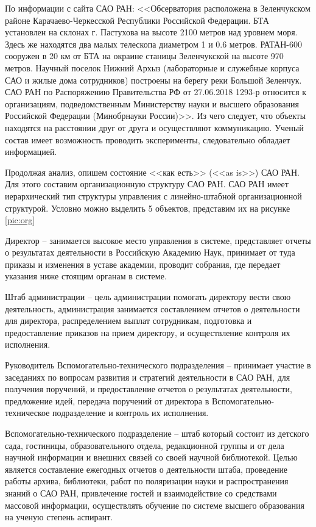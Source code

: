 По информации с сайта САО РАН: <<Обсерватория расположена в Зеленчукском районе Карачаево-Черкесской Республики Российской Федерации. БТА установлен на склонах г. Пастухова на высоте 2100 метров над уровнем моря. Здесь же находятся два малых телескопа диаметром 1 и 0.6 метров. РАТАН-600 сооружен в 20 км от БТА на окраине станицы Зеленчукской на высоте 970 метров. Научный поселок Нижний Архыз (лабораторные и служебные корпуса САО и жилые дома сотрудников) построены на берегу реки Большой Зеленчук. САО РАН по Распоряжению Правительства РФ от 27.06.2018 1293-р относится к организациям, подведомственным Министерству науки и высшего образования Российской Федерации (Минобрнауки России)>>\cite{Korn}. Из чего следует, что объекты находятся на расстоянии друг от друга и осуществляют коммуникацию. Ученый состав имеет возможность проводить эксперименты, следовательно обладает информацией. 

 

Продолжая анализ, опишем состояние <<как есть>> (<<as is>>) САО РАН. Для этого составим организационную структуру САО РАН. САО РАН имеет иерархический тип структуры управления с линейно-штабной организационной структурой. Условно можно выделить 5 объектов, представим их  на рисунке \ref{pic:org}

Директор -- занимается высокое место управления в системе, представляет отчеты о результатах деятельности в Российскую Академию Наук, принимает от туда приказы и изменения в уставе академии, проводит собрания, где передает указания ниже стоящим органам в системе.
  
Штаб администрации -- цель администрации помогать директору вести свою деятельность, администрация занимается составлением отчетов о деятельности для директора, распределением выплат сотрудникам, подготовка и предоставление приказов на прием директору, и осуществление контроля их исполнения.

Руководитель Вспомогательно-технического подразделения -- принимает участие в заседаниях по вопросам развития и стратегий деятельности в САО РАН, для получения поручений, и предоставление отчетов о результатах деятельности, предложение идей, передача поручений от директора в Вспомогательно-техническое подразделение и контроль их исполнения. 

Вспомогательно-технического подразделение -- штаб который состоит из детского сада, гостиницы, образовательного отдела, редакционной группы и от дела научной информации и внешних связей со своей научной библиотекой. Целью является составление ежегодных отчетов о деятельности штаба, проведение работы архива, библиотеки, работ по поляризации науки и распространения знаний о САО РАН, привлечение гостей и взаимодействие со средствами массовой информации, осуществлять обучение по системе высшего образования на ученую степень аспирант. 

